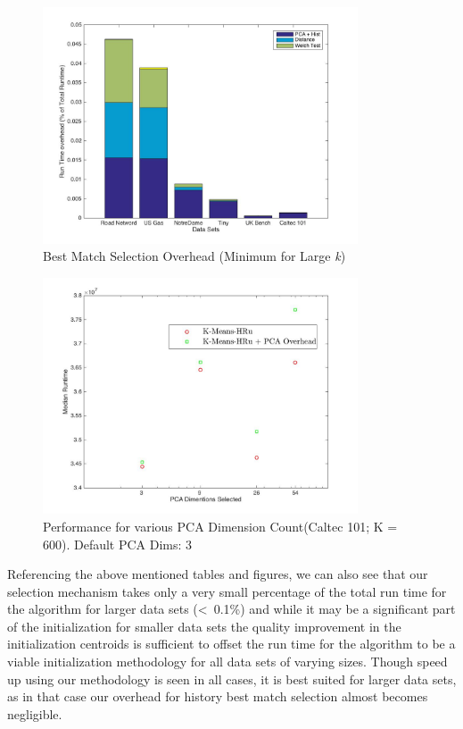 \documentclass{vldb}
\begin{document}
\begin{figure}[t!]
    \includegraphics[width=\textwidth , height=7cm,keepaspectratio]{stacked_overhead_large}
    \caption{Best Match Selection Overhead (Minimum for Large \textit{k})}
    \centering
    \label{fig:selection_overhead_large}
\end{figure}

\begin{figure}[b!]
    \includegraphics[width=\textwidth , height=7cm,keepaspectratio]{PCA_results}
    \caption{Performance for various PCA Dimension Count(Caltec 101; K = 600). Default PCA Dims: 3}
    \centering
    \label{fig:pca_overhead}
\end{figure}

Referencing the above mentioned tables and figures, we can also see that our selection mechanism takes only a very small percentage of the total run time for the algorithm for larger data sets (<~0.1\%) and while it may be a significant part of the initialization for smaller data sets the quality improvement in the initialization centroids is sufficient to offset the run time for the algorithm to be a viable initialization methodology for all data sets of varying sizes. 
Though speed up using our methodology is seen in all cases, it is best suited for larger data sets, as in that case our overhead for history best match selection almost becomes negligible.
\end{document}
